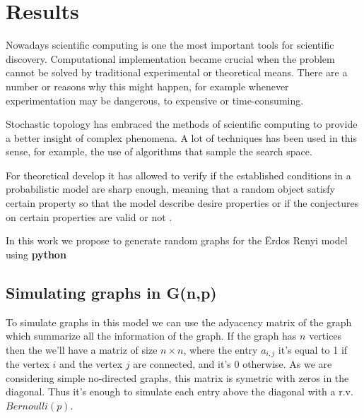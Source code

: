 
\chapter{Results} %

\label{Chapter3} %



Nowadays scientific computing is one the most important tools for scientific discovery. Computational implementation became crucial when the problem cannot be solved by traditional experimental or theoretical means. There are a number or reasons why this might happen, for example whenever experimentation may be dangerous, to expensive or time-consuming.

Stochastic topology has embraced the methods of scientific computing to provide a better insight of complex phenomena. A lot of techniques has been used in this sense, for example, the use of algorithms that sample the search space.

For theoretical develop it has allowed to verify if the established conditions in a probabilistic model are sharp enough, meaning that a random object satisfy certain property  so that the model describe desire properties or if the conjectures on certain properties are valid or not \cite{Meshulam13}.

In this work we propose to generate random graphs for the Ërdos Renyi model using \textbf{python}

\section{Simulating graphs in G(n,p)}
 To simulate graphs in this model we can use the adyacency matrix of the graph which summarize all the information of the graph. If the graph has $n$ vertices then the we'll have a matriz of size $n \times n$, where the entry $a_{i,j}$ it's equal to 1 if the vertex $i$ and the vertex $j$ are connected, and it's $0$ otherwise. As we are considering simple no-directed graphs, this matrix is symetric with zeros in the diagonal. Thus it's enough to simulate each entry above the diagonal with a r.v. $Bernoulli(p)$.
 

